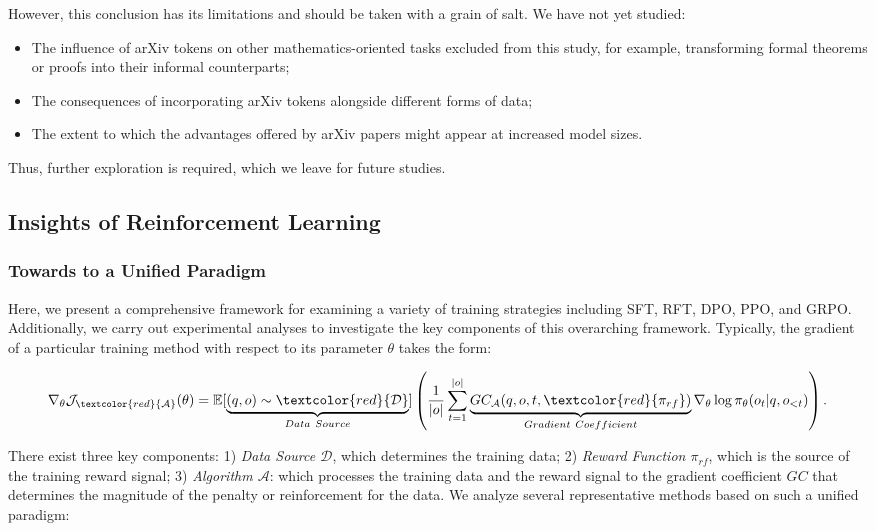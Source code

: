 \begin{itemize}[topsep=0pt]
\begin{itemize}[topsep=0pt]
However, this conclusion has its limitations and should be taken with a grain of salt. We have not yet studied:

\begin{itemize}[topsep=0pt]
    \item The influence of arXiv tokens on other mathematics-oriented tasks excluded from this study, for example, transforming formal theorems or proofs into their informal counterparts;
    \item The consequences of incorporating arXiv tokens alongside different forms of data;
    \item The extent to which the advantages offered by arXiv papers might appear at increased model sizes.
\end{itemize}

Thus, further exploration is required, which we leave for future studies.

\subsection{Insights of Reinforcement Learning}
\subsubsection{Towards to a Unified Paradigm} Here, we present a comprehensive framework for examining a variety of training strategies including SFT, RFT, DPO, PPO, and GRPO. Additionally, we carry out experimental analyses to investigate the key components of this overarching framework. Typically, the gradient of a particular training method with respect to its parameter $\theta$ takes the form:

\begin{equation}
    \nabla_{\theta}\mathcal{J}_{\textcolor{red}{\mathcal{A}}}(\theta) = \mathbb{E}[\underbrace{(q,o) \sim \textcolor{red}{\mathcal{D}}}_{Data \ Source}]\left( \frac{1}{|o|} \sum_{t=1}^{|o|}  \underbrace{GC_{{\mathcal{A}}}(q, o, t, \textcolor{red}{\pi_{{rf}}})}_{Gradient \ Coefficient}  \nabla_{\theta}\log \pi_{\theta}(o_t | q, o_{<t})\right).
\label{eq:objective}
\end{equation}

There exist three key components: 1) \textit{Data Source $\mathcal{D}$}, which determines the training data; 2) \textit{Reward Function $\pi_{{rf}}$}, which is the source of the training reward signal; 3) \textit{Algorithm $\mathcal{A}$}: which processes the training data and the reward signal to the gradient coefficient $GC$ that determines the magnitude of the penalty or reinforcement for the data. We analyze several representative methods based on such a unified paradigm:


\end{itemize}
\end{itemize}

